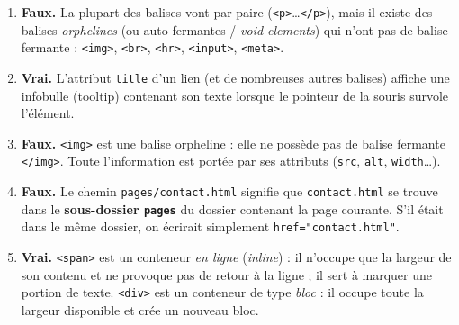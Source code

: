 \documentclass[11pt]{article}
\newcommand{\cle}[1]{{\popxbold\color{popdark}#1}}
\begin{document}
\begin{corrige}
\begin{enumerate}
\item \textbf{Faux.} La plupart des balises vont par paire (\texttt{<p>}\ldots\texttt{</p>}), mais il existe des balises \emph{orphelines} (ou \cle{auto-fermantes} / \emph{void elements}) qui n'ont pas de balise fermante : \texttt{<img>}, \texttt{<br>}, \texttt{<hr>}, \texttt{<input>}, \texttt{<meta>}.
\item \textbf{Vrai.} L'attribut \texttt{title} d'un lien (et de nombreuses autres balises) affiche une \cle{infobulle} (tooltip) contenant son texte lorsque le pointeur de la souris survole l'élément.
\item \textbf{Faux.} \texttt{<img>} est une balise orpheline : elle ne possède pas de balise fermante \texttt{</img>}. Toute l'information est portée par ses attributs (\texttt{src}, \texttt{alt}, \texttt{width}\ldots).
\item \textbf{Faux.} Le chemin \texttt{pages/contact.html} signifie que \texttt{contact.html} se trouve dans le \textbf{sous-dossier \texttt{pages}} du dossier contenant la page courante. S'il était dans le même dossier, on écrirait simplement \texttt{href="contact.html"}.
\item \textbf{Vrai.} \texttt{<span>} est un conteneur \emph{en ligne} (\emph{inline}) : il n'occupe que la largeur de son contenu et ne provoque pas de retour à la ligne ; il sert à marquer une portion de texte. \texttt{<div>} est un conteneur de type \emph{bloc} : il occupe toute la largeur disponible et crée un nouveau bloc.
\end{enumerate}
\end{corrige}
\end{document}

